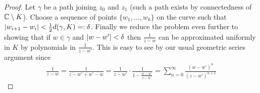 \begin{proof}
        Let $\gamma$ be a path joining $z_0$ and $z_1$ (such a path exists by connectedness of $\mathbb{C} \setminus K$). Choose a sequence of points $\{w_1, \dots, w_k\}$ on the curve such that $\left|w_{i + 1} - w_i\right| < \frac{1}{2} d(\gamma, K) =: \delta$. Finally we reduce the problem even further to showing that if $w \in \gamma$ and $\left|w - w'\right| < \delta$ then $\frac{1}{z - w}$ can be approximated uniformly in $K$ by polynomials in $\frac{1}{z - w'}$. This is easy to see by our usual geometric series argument since
        \begin{align*}
            \frac{1}{z - w} = \frac{1}{z - w' + w' - w} = \frac{1}{z - w'} \cdot \frac{1}{1 - \frac{w - w'}{z - w'}} = \sum_{n = 0}^\infty \frac{(w - w')^n}{(z - w')^{n + 1}}
        \end{align*}
    \end{proof}

